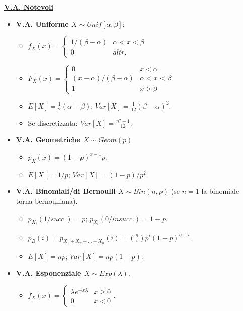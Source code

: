 \documentclass{article}
\begin{document}
\begin{multicols*}{3}
\textbf{\underline{V.A. Notevoli}}
\begin{itemize}
    \item \textbf{V.A. Uniforme $X\sim Unif[\alpha, \beta]$}:
    \begin{itemize}
        \item $f_{X}(x)=\begin{cases}
            1/(\beta-\alpha) &\alpha<x<\beta \\
            0 &altr.
        \end{cases}$
        \item $F_{X}(x)=\begin{cases}
            0 &x<\alpha \\
            (x-\alpha)/(\beta-\alpha) &\alpha<x<\beta \\
            1 &x>\beta
        \end{cases}$
        \item $E[X]=\frac{1}{2}(\alpha +\beta)$; $Var[X]=\frac{1}{12}(\beta -\alpha)^{2}$.
        \item Se discretizzata: $Var[X]=\frac{n^{2}-1}{12}$.
    \end{itemize}
    \newpage
    \item \textbf{V.A. Geometriche $X\sim Geom(p)$}
    \begin{itemize}
        \item $p_{X}(x)=(1-p)^{x-1}p$.
        \item $E[X]=1/p$; $Var[X]=(1-p)/p^{2}$.
    \end{itemize}
    \item \textbf{V.A. Binomiali/di Bernoulli $X\sim Bin(n,p)$} (se $n=1$ la binomiale torna bernoulliana).
    \begin{itemize}
        \item $p_{X_{i}}(1/succ.)=p$; $p_{X_{i}}(0/insucc.)=1-p$.
        \item $p_{B}(i)=p_{X_{1}+X_{2}+...+X_{n}}(i)=\binom{n}{i}p^{i}(1-p)^{n-i}$.
        \item $E[X]=np$; $Var[X]=np(1-p)$.
    \end{itemize}
    \item \textbf{V.A. Esponenziale $X\sim Exp(\lambda)$}.
    \begin{itemize}
        \item $f_{X}(x)=\begin{cases}
            \lambda e^{-x\lambda} &x\geq 0 \\
            0 &x<0
        \end{cases}$.

\end{itemize}
\end{itemize}
\end{multicols*}
\end{document}
